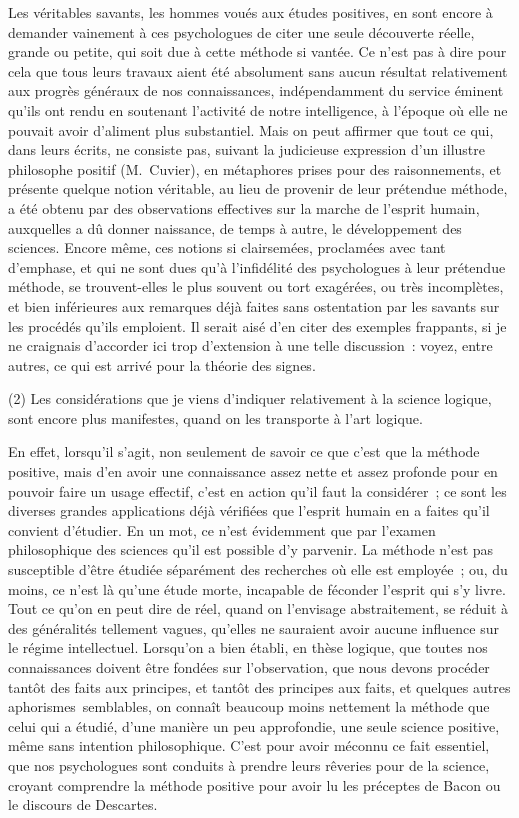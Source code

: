 \documentclass[french,twoside]{book} %
\begin{document}
Les véritables savants, les hommes voués aux études positives, en sont encore à demander vainement à ces psychologues de citer une seule découverte réelle, grande ou petite, qui soit due à cette méthode si vantée. Ce n’est pas à dire pour cela que tous leurs travaux aient été absolument sans aucun résultat relativement aux progrès généraux de nos connaissances, indépendamment du service éminent qu’ils ont rendu en soutenant l’activité de notre intelligence, à l’époque où elle ne pouvait avoir d’aliment plus substantiel. Mais on peut affirmer que tout ce qui, dans leurs écrits, ne consiste pas, suivant la judicieuse expression d’un illustre philosophe positif (M. Cuvier), en métaphores prises pour des raisonnements, et présente quelque notion véritable, au lieu de provenir de leur prétendue méthode, a été obtenu par des observations effectives sur la marche de l’esprit humain, auxquelles a dû donner naissance, de temps à autre, le développement des sciences. Encore même, ces notions si clairsemées, proclamées avec tant d’emphase, et qui ne sont dues qu’à l’infidélité des psychologues à leur prétendue méthode, se trouvent-elles le plus souvent ou tort exagérées, ou très incomplètes, et bien inférieures aux remarques déjà faites sans ostentation par les savants sur les procédés qu’ils emploient. Il serait aisé d’en citer des exemples frappants, si je ne craignais d’accorder ici trop d’extension à une telle discussion : voyez, entre autres, ce qui est arrivé pour la théorie des signes.\par
(2) Les considérations que je viens d’indiquer relativement à la science logique, sont encore plus manifestes, quand on les transporte à l’art logique.\par
En effet, lorsqu’il s’agit, non seulement de savoir ce que c’est que la méthode positive, mais d’en avoir une connaissance assez nette et assez profonde pour en pouvoir faire un usage effectif, c’est en action qu’il faut la considérer ; ce sont les diverses grandes applications déjà vérifiées que l’esprit humain en a faites qu’il convient d’étudier. En un mot, ce n’est évidemment que par l’examen philosophique des sciences qu’il est possible d’y parvenir. La méthode n’est pas susceptible d’être étudiée séparément des recherches où elle est employée ; ou, du moins, ce n’est là qu’une étude morte, incapable de féconder l’esprit qui s’y livre. Tout ce qu’on en peut dire de réel, quand on l’envisage abstraitement, se réduit à des généralités tellement vagues, qu’elles ne sauraient avoir aucune influence sur le régime intellectuel. Lorsqu’on a bien établi, en thèse logique, que toutes nos connaissances doivent être fondées sur l’observation, que nous devons procéder tantôt des faits aux principes, et tantôt des principes aux faits, et quelques autres aphorismes semblables, on connaît beaucoup moins nettement la méthode que celui qui a étudié, d’une manière un peu approfondie, une seule science positive, même sans intention philosophique. C’est pour avoir méconnu ce fait essentiel, que nos psychologues sont conduits à prendre leurs rêveries pour de la science, croyant comprendre la méthode positive pour avoir lu les préceptes de Bacon ou le discours de Descartes.\par
\end{document}
